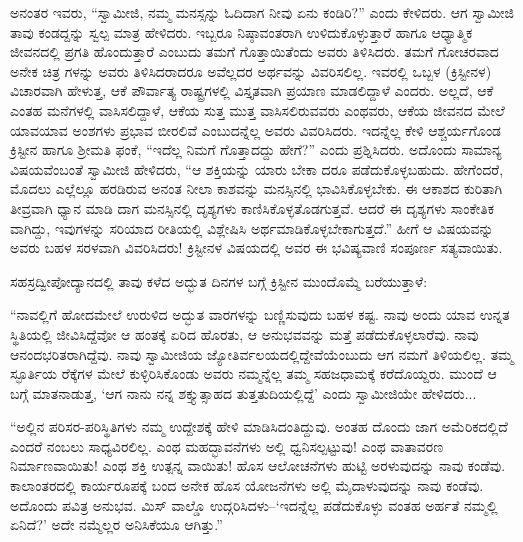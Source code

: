 ಅನಂತರ ಇವರು, “ಸ್ವಾಮೀಜಿ, ನಮ್ಮ ಮನಸ್ಸನ್ನು ಓದಿದಾಗ ನೀವು ಏನು ಕಂಡಿರಿ?” ಎಂದು ಕೇಳಿದರು. ಆಗ ಸ್ವಾಮೀಜಿ ತಾವು ಕಂಡದ್ದನ್ನು ಸ್ವಲ್ಪ ಮಾತ್ರ ಹೇಳಿದರು. ಇಬ್ಬರೂ ನಿಷ್ಠಾವಂತರಾಗಿ ಉಳಿದುಕೊಳ್ಳುತ್ತಾರೆ ಹಾಗೂ ಆಧ್ಯಾತ್ಮಿಕ ಜೀವನದಲ್ಲಿ ಪ್ರಗತಿ ಹೊಂದುತ್ತಾರೆ ಎಂಬುದು ತಮಗೆ ಗೊತ್ತಾಯಿತೆಂದು ಅವರು ತಿಳಿಸಿದರು. ತಮಗೆ ಗೋಚರವಾದ ಅನೇಕ ಚಿತ್ರ ಗಳನ್ನು ಅವರು ತಿಳಿಸಿದರಾದರೂ ಅವೆಲ್ಲದರ ಅರ್ಥವನ್ನು ವಿವರಿಸಲಿಲ್ಲ. ಇವರಲ್ಲಿ ಒಬ್ಬಳ (ಕ್ರಿಸ್ಟೀನಳ) ವಿಚಾರವಾಗಿ ಹೇಳುತ್ತ, ಆಕೆ ಪೌರ್ವಾತ್ಯ ರಾಷ್ಟ್ರಗಳಲ್ಲಿ ವಿಸ್ತೃತವಾಗಿ ಪ್ರಯಾಣ ಮಾಡಲಿದ್ದಾಳೆ ಎಂದರು. ಅಲ್ಲದೆ, ಆಕೆ ಎಂತಹ ಮನೆಗಳಲ್ಲಿ ವಾಸಿಸಲಿದ್ದಾಳೆ, ಆಕೆಯ ಸುತ್ತ ಮುತ್ತ ವಾಸಿಸಲಿರುವವರು ಎಂಥವರು, ಆಕೆಯ ಜೀವನದ ಮೇಲೆ ಯಾವಯಾವ ಅಂಶಗಳು ಪ್ರಭಾವ ಬೀರಲಿವೆ ಎಂಬುದನ್ನೆಲ್ಲ ಅವರು ವಿವರಿಸಿದರು. ಇದನ್ನೆಲ್ಲ ಕೇಳಿ ಆಶ್ಚರ್ಯಗೊಂಡ ಕ್ರಿಸ್ಟೀನ ಹಾಗೂ ಶ್ರೀಮತಿ ಫಂಕೆ, “ಇದೆಲ್ಲ ನಿಮಗೆ ಗೊತ್ತಾದದ್ದು ಹೇಗೆ?” ಎಂದು ಪ್ರಶ್ನಿಸಿದರು. ಅದೊಂದು ಸಾಮಾನ್ಯ ವಿಷಯವೆಂಬಂತೆ ಸ್ವಾಮೀಜಿ ಹೇಳಿದರು, “ಆ ಶಕ್ತಿಯನ್ನು ಯಾರು ಬೇಕಾ ದರೂ ಪಡೆದುಕೊಳ್ಳಬಹುದು. ಹೇಗೆಂದರೆ, ಮೊದಲು ಎಲ್ಲೆಲ್ಲೂ ಹರಡಿರುವ ಅನಂತ ನೀಲಾ ಕಾಶವನ್ನು ಮನಸ್ಸಿನಲ್ಲಿ ಭಾವಿಸಿಕೊಳ್ಳಬೇಕು. ಈ ಆಕಾಶದ ಕುರಿತಾಗಿ ತೀವ್ರವಾಗಿ ಧ್ಯಾನ ಮಾಡಿ ದಾಗ ಮನಸ್ಸಿನಲ್ಲಿ ದೃಶ್ಯಗಳು ಕಾಣಿಸಿಕೊಳ್ಳತೊಡಗುತ್ತವೆ. ಆದರೆ ಈ ದೃಶ್ಯಗಳು ಸಾಂಕೇತಿಕ ವಾಗಿದ್ದು, ಇವುಗಳನ್ನು ಸರಿಯಾದ ರೀತಿಯಲ್ಲಿ ವಿಶ್ಲೇಷಿಸಿ ಅರ್ಥಮಾಡಿಕೊಳ್ಳಬೇಕಾಗುತ್ತದೆ.” ಹೀಗೆ ಆ ವಿಷಯವನ್ನು ಅವರು ಬಹಳ ಸರಳವಾಗಿ ವಿವರಿಸಿದರು! ಕ್ರಿಸ್ಟೀನಳ ವಿಷಯದಲ್ಲಿ ಅವರ ಈ ಭವಿಷ್ಯವಾಣಿ ಸಂಪೂರ್ಣ ಸತ್ಯವಾಯಿತು.

ಸಹಸ್ರದ್ವೀಪೋದ್ಯಾನದಲ್ಲಿ ತಾವು ಕಳೆದ ಅದ್ಭುತ ದಿನಗಳ ಬಗ್ಗೆ ಕ್ರಿಸ್ಟೀನ ಮುಂದೊಮ್ಮೆ ಬರೆಯುತ್ತಾಳೆ:

“ನಾವಲ್ಲಿಗೆ ಹೋದಮೇಲೆ ಉರುಳಿದ ಅದ್ಭುತ ವಾರಗಳನ್ನು ಬಣ್ಣಿಸುವುದು ಬಹಳ ಕಷ್ಟ. ನಾವು ಅಂದು ಯಾವ ಉನ್ನತ ಸ್ಥಿತಿಯಲ್ಲಿ ಜೀವಿಸಿದ್ದೆವೋ ಆ ಹಂತಕ್ಕೆ ಏರಿದ ಹೊರತು, ಆ ಅನುಭವವನ್ನು ಮತ್ತೆ ಪಡೆದುಕೊಳ್ಳಲಾರೆವು. ನಾವು ಆನಂದಭರಿತರಾಗಿದ್ದೆವು. ನಾವು ಸ್ವಾಮೀಜಿಯ ಜ್ಯೋತಿರ್ವಲಯದಲ್ಲಿದ್ದೇವೆಯೆಂಬುದು ಆಗ ನಮಗೆ ತಿಳಿಯಲಿಲ್ಲ. ತಮ್ಮ ಸ್ಫೂರ್ತಿಯ ರೆಕ್ಕೆಗಳ ಮೇಲೆ ಕುಳ್ಳಿರಿಸಿಕೊಂಡು ಅವರು ನಮ್ಮನ್ನೆಲ್ಲ ತಮ್ಮ ಸಹಜಧಾಮಕ್ಕೆ ಕರೆದೊಯ್ದರು. ಮುಂದೆ ಆ ಬಗ್ಗೆ ಮಾತನಾಡುತ್ತ, ‘ಆಗ ನಾನು ನನ್ನ ಶಕ್ತ್ಯುತ್ಸಾಹದ ತುತ್ತತುದಿಯಲ್ಲಿದ್ದೆ’ ಎಂದು ಸ್ವಾಮೀಜಿಯೇ ಹೇಳಿದರು...

“ಅಲ್ಲಿನ ಪರಿಸರ-ಪರಿಸ್ಥಿತಿಗಳು ನಮ್ಮ ಉದ್ದೇಶಕ್ಕೆ ಹೇಳಿ ಮಾಡಿಸಿದಂತಿದ್ದುವು. ಅಂತಹ ದೊಂದು ಜಾಗ ಅಮೆರಿಕದಲ್ಲಿದೆ ಎಂದರೆ ನಂಬಲು ಸಾಧ್ಯವಿರಲಿಲ್ಲ. ಎಂಥ ಮಹದ್ಭಾವನೆಗಳು ಅಲ್ಲಿ ಧ್ವನಿಸಲ್ಪಟ್ಟುವು! ಎಂಥ ವಾತಾವರಣ ನಿರ್ಮಾಣವಾಯಿತು! ಎಂಥ ಶಕ್ತಿ ಉತ್ಪನ್ನ ವಾಯಿತು! ಹೊಸ ಆಲೋಚನೆಗಳು ಹುಟ್ಟಿ ಅರಳುವುದನ್ನು ನಾವು ಕಂಡೆವು. ಕಾಲಾಂತರದಲ್ಲಿ ಕಾರ್ಯರೂಪಕ್ಕೆ ಬಂದ ಅನೇಕ ಹೊಸ ಯೋಜನೆಗಳು ಅಲ್ಲಿ ಮೈದಾಳುವುದನ್ನು ನಾವು ಕಂಡೆವು. ಅದೊಂದು ಪವಿತ್ರ ಅನುಭವ. ಮಿಸ್ ವಾಲ್ಡೊ ಉದ್ಗರಿಸಿದಳು–‘ಇದನ್ನೆಲ್ಲ ಪಡೆದುಕೊಳ್ಳು ವಂತಹ ಅರ್ಹತೆ ನಮ್ಮಲ್ಲಿ ಏನಿದೆ?’ ಅದೇ ನಮ್ಮೆಲ್ಲರ ಅನಿಸಿಕೆಯೂ ಆಗಿತ್ತು.”

